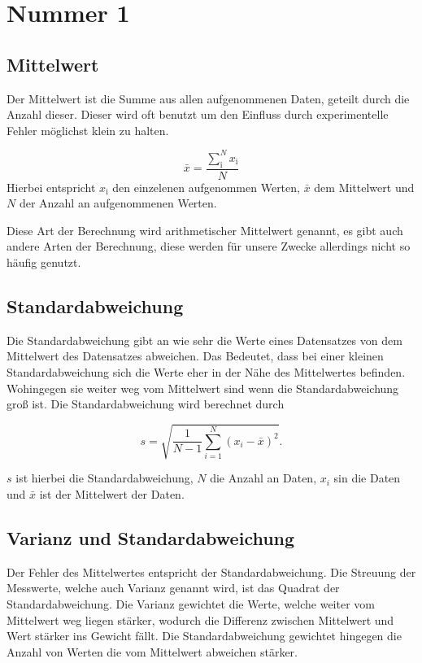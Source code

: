 \section{Nummer 1}
\label{sec:nummer1}

\subsection{Mittelwert}
Der Mittelwert ist die Summe aus allen aufgenommenen Daten, geteilt durch die Anzahl dieser.
Dieser wird oft benutzt um den Einfluss durch experimentelle Fehler möglichst klein zu halten.

\begin{equation*}
    \bar x = \frac{\sum_\text{i}^N x_\text{i}}{N} 
\end{equation*}
Hierbei entspricht $x_\text{i}$ den einzelenen aufgenommen Werten, $\bar x$ dem Mittelwert und $N$ der Anzahl an aufgenommenen Werten.

Diese Art der Berechnung wird arithmetischer Mittelwert genannt,
 es gibt auch andere Arten der Berechnung, 
 diese werden für unsere Zwecke allerdings nicht so häufig genutzt.

\subsection{Standardabweichung}

Die Standardabweichung gibt an wie sehr die Werte eines Datensatzes von dem Mittelwert des Datensatzes abweichen.
Das Bedeutet, dass bei einer kleinen Standardabweichung sich die Werte eher in der Nähe des Mittelwertes befinden.
Wohingegen sie weiter weg vom Mittelwert sind wenn die Standardabweichung groß ist.
Die Standardabweichung wird berechnet durch

\begin{equation*}
    s = \sqrt{\frac{1}{N-1} \sum _{i=1}^N(x_i -\bar x)^2}.
\end{equation*}

$s$ ist hierbei die Standardabweichung, $N$ die Anzahl an Daten, $x_i$ sin die Daten und $\bar x$ ist der Mittelwert der Daten.

\subsection{Varianz und Standardabweichung}

Der Fehler des Mittelwertes entspricht der Standardabweichung.
Die Streuung der Messwerte, welche auch Varianz genannt wird, ist das Quadrat der Standardabweichung.
Die Varianz gewichtet die Werte, welche weiter vom Mittelwert weg liegen stärker, wodurch die Differenz zwischen Mittelwert und Wert stärker ins Gewicht fällt.
Die Standardabweichung gewichtet hingegen die Anzahl von Werten die vom Mittelwert abweichen stärker.


